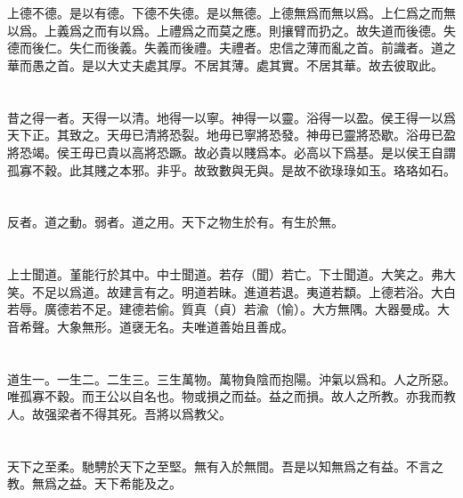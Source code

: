 \documentclass[a5paper]{ctexbook}
\begin{document}
    \chapter{}

    上德不德。是以有德。下德不失德。是以無德。上德無爲而無以爲。上仁爲之而無以爲。上義爲之而有以爲。上禮爲之而莫之應。則攘臂而扔之。故失道而後德。失德而後仁。失仁而後義。失義而後禮。夫禮者。忠信之薄而亂之首。前識者。道之華而愚之首。是以大丈夫處其厚。不居其薄。處其實。不居其華。故去彼取此。

    \chapter{}

    昔之得一者。天得一以清。地得一以寧。神得一以靈。浴得一以盈。侯王得一以爲天下正。其致之。天毋已清將恐裂。地毋已寧將恐發。神毋已靈將恐歇。浴毋已盈將恐竭。侯王毋已貴以高將恐蹶。故必貴以賤爲本。必高以下爲基。是以侯王自謂孤寡不穀。此其賤之本邪。非乎。故致數與无與。是故不欲琭琭如玉。珞珞如石。

    \chapter{}

    反者。道之動。弱者。道之用。天下之物生於有。有生於無。

    \chapter{}

    上士聞道。堇能行於其中。中士聞道。若存（聞）若亡。下士聞道。大笑之。弗大笑。不足以爲道。故建言有之。明道若昧。進道若退。夷道若纇。上德若浴。大白若辱。廣德若不足。建德若偷。質真（貞）若渝（愉）。大方無隅。大器曼成。大音希聲。大象無形。道襃无名。夫唯道善始且善成。

    \chapter{}

    道生一。一生二。二生三。三生萬物。萬物負陰而抱陽。沖氣以爲和。人之所惡。唯孤寡不穀。而王公以自名也。物或損之而益。益之而損。故人之所教。亦我而教人。故强梁者不得其死。吾將以爲教父。

    \chapter{}

    天下之至柔。馳騁於天下之至堅。無有入於無間。吾是以知無爲之有益。不言之教。無爲之益。天下希能及之。
\end{document}
